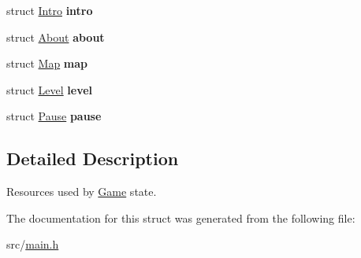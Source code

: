 \begin{DoxyCompactItemize}
\item 
\hypertarget{structGame_afcc0b09f19df8162100973a002509000}{struct \hyperlink{structIntro}{\-Intro} {\bfseries intro}}\label{structGame_afcc0b09f19df8162100973a002509000}

\item 
\hypertarget{structGame_a0f7f35de759c984c4b53c86fb0dcbd44}{struct \hyperlink{structAbout}{\-About} {\bfseries about}}\label{structGame_a0f7f35de759c984c4b53c86fb0dcbd44}

\item 
\hypertarget{structGame_aaab875b9e556df53251db40341046cab}{struct \hyperlink{structMap}{\-Map} {\bfseries map}}\label{structGame_aaab875b9e556df53251db40341046cab}

\item 
\hypertarget{structGame_aa258068886c6db9c88d73e07c7e114f2}{struct \hyperlink{structLevel}{\-Level} {\bfseries level}}\label{structGame_aa258068886c6db9c88d73e07c7e114f2}

\item 
\hypertarget{structGame_a3fe420d2d9b47cbdbb26d4f68bb5a0f0}{struct \hyperlink{structPause}{\-Pause} {\bfseries pause}}\label{structGame_a3fe420d2d9b47cbdbb26d4f68bb5a0f0}

\end{DoxyCompactItemize}


\subsection{\-Detailed \-Description}
\-Resources used by \hyperlink{structGame}{\-Game} state. 

\-The documentation for this struct was generated from the following file\-:\begin{DoxyCompactItemize}
\item 
src/\hyperlink{main_8h}{main.\-h}\end{DoxyCompactItemize}
